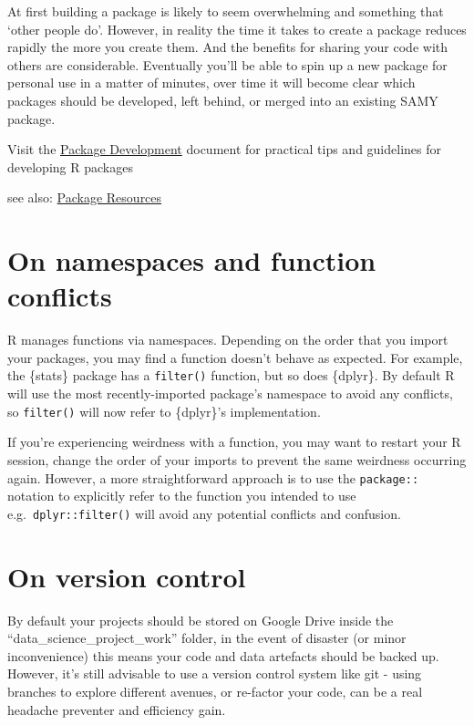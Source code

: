 \documentclass[
  letterpaper,
  DIV=11,
  numbers=noendperiod]{scrreprt}
\begin{document}
At first building a package is likely to seem overwhelming and something
that `other people do'. However, in reality the time it takes to create
a package reduces rapidly the more you create them. And the benefits for
sharing your code with others are considerable. Eventually you'll be
able to spin up a new package for personal use in a matter of minutes,
over time it will become clear which packages should be developed, left
behind, or merged into an existing SAMY package.

Visit the \href{package_development.qmd}{Package Development} document
for practical tips and guidelines for developing R packages

see also: \hyperref[package-development]{Package Resources}

\section{On namespaces and function
conflicts}\label{on-namespaces-and-function-conflicts}

R manages functions via namespaces. Depending on the order that you
import your packages, you may find a function doesn't behave as
expected. For example, the \{stats\} package has a \texttt{filter()}
function, but so does \{dplyr\}. By default R will use the most
recently-imported package's namespace to avoid any conflicts, so
\texttt{filter()} will now refer to \{dplyr\}'s implementation.

If you're experiencing weirdness with a function, you may want to
restart your R session, change the order of your imports to prevent the
same weirdness occurring again. However, a more straightforward approach
is to use the \texttt{package::} notation to explicitly refer to the
function you intended to use e.g.~\texttt{dplyr::filter()} will avoid
any potential conflicts and confusion.

\section{On version control}\label{on-version-control}

By default your projects should be stored on Google Drive inside the
``data\_science\_project\_work'' folder, in the event of disaster (or
minor inconvenience) this means your code and data artefacts should be
backed up. However, it's still advisable to use a version control system
like git - using branches to explore different avenues, or re-factor
your code, can be a real headache preventer and efficiency gain.
\end{document}
